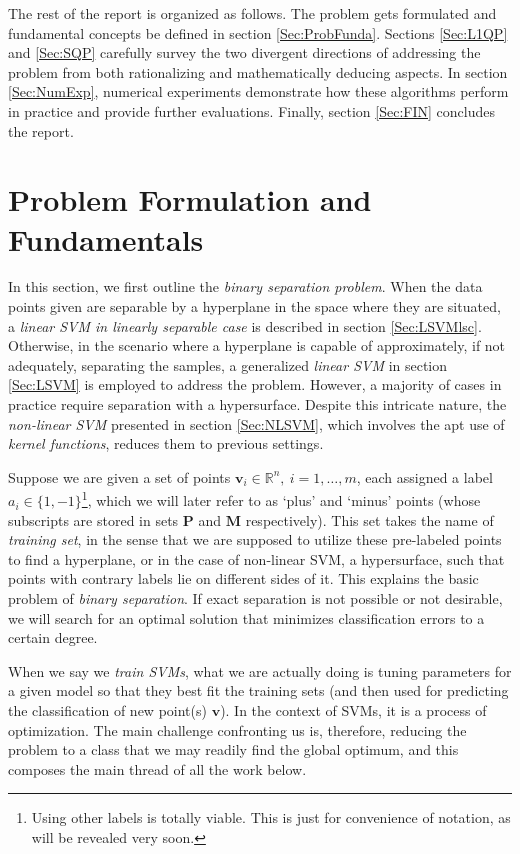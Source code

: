 \documentclass[11pt,a4paper]{article}
\theoremstyle{definition}
\renewcommand{\vec}[1]{\boldsymbol{#1}}
\begin{document}
    The rest of the report is organized as follows. The problem gets formulated and fundamental concepts be defined in section \ref{Sec:ProbFunda}. Sections \ref{Sec:L1QP} and \ref{Sec:SQP} carefully survey the two divergent directions of addressing the problem from both rationalizing and mathematically deducing aspects. In section \ref{Sec:NumExp}, numerical experiments demonstrate how these algorithms perform in practice and provide further evaluations. Finally, section \ref{Sec:FIN} concludes the report.

  \section{Problem Formulation and Fundamentals\label{Sec:ProbFunda}}
    In this section, we first outline the \textit{binary separation problem}. When the data points given are separable by a hyperplane in the space where they are situated, a \textit{linear SVM in linearly separable case} is described in section \ref{Sec:LSVMlsc}. Otherwise, in the scenario where a hyperplane is capable of approximately, if not adequately, separating the samples, a generalized \textit{linear SVM} in section \ref{Sec:LSVM} is employed to address the problem. However, a majority of cases in practice require separation with a hypersurface. Despite this intricate nature, the \textit{non-linear SVM} presented in section \ref{Sec:NLSVM}, which involves the apt use of \textit{kernel functions}, reduces them to previous settings.

    Suppose we are given a set of points $\vec{v}_{i}\in\mathbb{R}^{n},~i=1,\dots,m$, each assigned a label $a_{i}\in\{1,-1\}$\footnote{Using other labels is totally viable. This is just for convenience of notation, as will be revealed very soon.}, which we will later refer to as `plus' and `minus' points (whose subscripts are stored in sets $\mathbf{P}$ and $\mathbf{M}$ respectively). This set takes the name of \textit{training set}, in the sense that we are supposed to utilize these pre-labeled points to find a hyperplane, or in the case of non-linear SVM, a hypersurface, such that points with contrary labels lie on different sides of it. This explains the basic problem of \textit{binary separation}. If exact separation is not possible or not desirable, we will search for an optimal solution that minimizes classification errors to a certain degree.

    When we say we \textit{train SVMs}, what we are actually doing is tuning parameters for a given model so that they best fit the training sets (and then used for predicting the classification of new point(s) $\vec{v}$). In the context of SVMs, it is a process of optimization. The main challenge confronting us is, therefore, reducing the problem to a class that we may readily find the global optimum, and this composes the main thread of all the work below.
\end{document}
